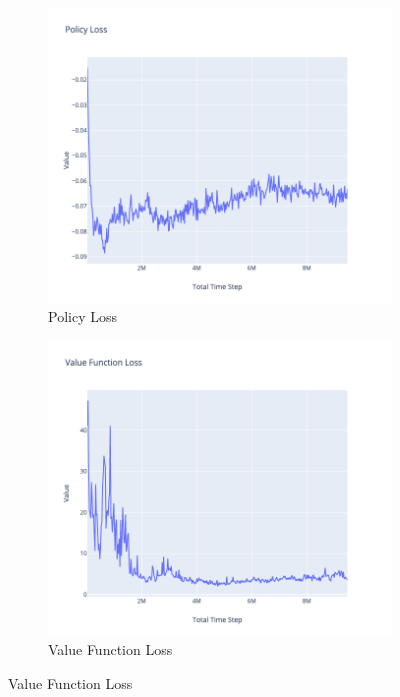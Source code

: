\begin{figure}[!htb]
	\begin{subfigure}[!htb]{0.35\textwidth}
		\centering
		\includegraphics[width=\textwidth]{figures/exps/1st_exp/policy_loss}
		\caption{Policy Loss}
		\label{fig:policy_loss}
	\end{subfigure}
	\hfill
	\begin{subfigure}[!htb]{0.35\textwidth}
		\centering
		\includegraphics[width=\textwidth]{figures/exps/1st_exp/vf_loss}
		\caption{Value Function Loss}
		\label{fig:vf_loss}
	\end{subfigure}
	\hfill
	

\end{figure}
